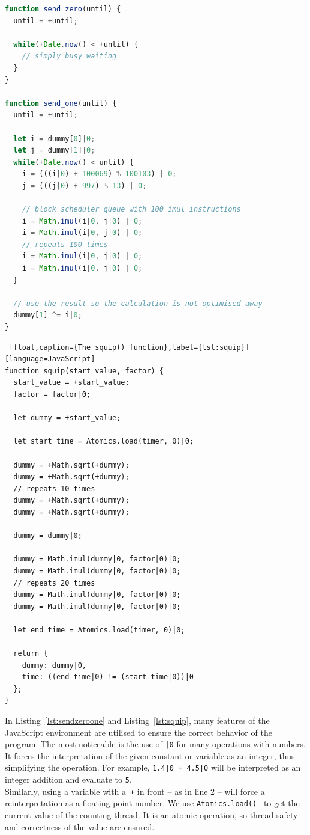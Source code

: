 \documentclass[11pt,
  titlepage=false,
  parskip=half,      %
]{scrreprt}
\begin{document}
\begin{lstlisting}[float,caption={The functions \texttt{send\_zero()} and \texttt{send\_one()}},label={lst:sendzeroone},language=JavaScript]
function send_zero(until) {
  until = +until;

  while(+Date.now() < +until) {
    // simply busy waiting
  }
}

function send_one(until) {
  until = +until;

  let i = dummy[0]|0;
  let j = dummy[1]|0;
  while(+Date.now() < until) {
    i = (((i|0) + 100069) % 100103) | 0;
    j = (((j|0) + 997) % 13) | 0;

    // block scheduler queue with 100 imul instructions
    i = Math.imul(i|0, j|0) | 0;
    i = Math.imul(i|0, j|0) | 0;
    // repeats 100 times
    i = Math.imul(i|0, j|0) | 0;
    i = Math.imul(i|0, j|0) | 0;
  }

  // use the result so the calculation is not optimised away
  dummy[1] ^= i|0;
}
\end{lstlisting}

\begin{lstlisting} [float,caption={The squip() function},label={lst:squip}][language=JavaScript]
function squip(start_value, factor) {
  start_value = +start_value;
  factor = factor|0;

  let dummy = +start_value;

  let start_time = Atomics.load(timer, 0)|0;

  dummy = +Math.sqrt(+dummy);
  dummy = +Math.sqrt(+dummy);
  // repeats 10 times
  dummy = +Math.sqrt(+dummy);
  dummy = +Math.sqrt(+dummy);

  dummy = dummy|0;

  dummy = Math.imul(dummy|0, factor|0)|0;
  dummy = Math.imul(dummy|0, factor|0)|0;
  // repeats 20 times
  dummy = Math.imul(dummy|0, factor|0)|0;
  dummy = Math.imul(dummy|0, factor|0)|0;

  let end_time = Atomics.load(timer, 0)|0;

  return {
    dummy: dummy|0,
    time: ((end_time|0) != (start_time|0))|0
  };
}
\end{lstlisting}

In Listing~\ref{lst:sendzeroone} and Listing~\ref{lst:squip}, many features of the JavaScript environment are utilised to ensure the correct behavior of the program.
The most noticeable is the use of \texttt{|0} for many operations with numbers.
It forces the interpretation of the given constant or variable as an integer, thus simplifying the operation.
For example, \texttt{1.4|0 + 4.5|0} will be interpreted as an integer addition and evaluate to \texttt{5}. \\
Similarly, using a variable with a~\texttt{+} in front -- as in line 2 -- will force a reinterpretation as a floating-point number.
We use \texttt{Atomics.load()}~\cite{atomicsload} to get the current value of the counting thread.
It is an atomic operation, so thread safety and correctness of the value are ensured.
\end{document}
